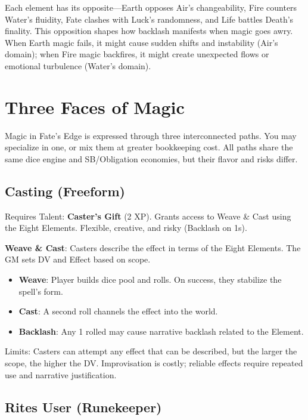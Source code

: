 Each element has its opposite—Earth opposes Air's changeability, Fire counters Water's fluidity, Fate clashes with Luck's randomness, and Life battles Death's finality. This opposition shapes how backlash manifests when magic goes awry. When Earth magic fails, it might cause sudden shifts and instability (Air's domain); when Fire magic backfires, it might create unexpected flows or emotional turbulence (Water's domain).

\section*{Three Faces of Magic}

Magic in Fate's Edge is expressed through three interconnected paths. You may specialize in one, or mix them at greater bookkeeping cost. All paths share the same dice engine and SB/Obligation economies, but their flavor and risks differ.

\subsection*{Casting (Freeform)}

Requires Talent: \textbf{Caster's Gift} (2 XP). Grants access to Weave & Cast using the Eight Elements. Flexible, creative, and risky (Backlash on 1s).

\textbf{Weave \& Cast}: Casters describe the effect in terms of the Eight Elements. The GM sets DV and Effect based on scope.
\begin{itemize}
    \item \textbf{Weave}: Player builds dice pool and rolls. On success, they stabilize the spell's form.
    \item \textbf{Cast}: A second roll channels the effect into the world.
    \item \textbf{Backlash}: Any 1 rolled may cause narrative backlash related to the Element.
\end{itemize}

Limits: Casters can attempt any effect that can be described, but the larger the scope, the higher the DV. Improvisation is costly; reliable effects require repeated use and narrative justification.

\subsection*{Rites User (Runekeeper)}

